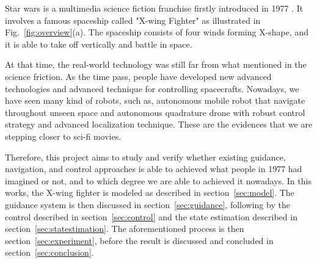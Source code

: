 Star wars is a multimedia science fiction franchise firstly introduced in 1977 \cite{starwars}. It involves a famous spaceship called "X-wing Fighter" as illustrated in Fig.~\ref{fig:overview}(a). The spaceship consists of four winds forming X-shape, and it is able to take off vertically and battle in space. 

At that time, the real-world technology was still far from what mentioned in the science friction. As the time pass, people have developed new advanced technologies and advanced technique for controlling spacecrafts. Nowadays, we have seen many kind of robots, such as, autonomous mobile robot \cite{mir} that navigate throughout unseen space and autonomous quadrature drone \cite{mpc_drone,scimet_paper} with robust control strategy and advanced localization technique. These are the evidences that we are stepping closer to sci-fi movies. 

Therefore, this project aims to study and verify whether existing guidance, navigation, and control approaches is able to achieved what people in 1977 had imagined or not, and to which degree we are able to achieved it nowadays. In this works, the X-wing fighter is modeled as described in section~\ref{sec:model}. The guidance system is then discussed in section~\ref{sec:guidance}, following by the control described in  section~\ref{sec:control} and the state estimation described in  section~\ref{sec:statestimation}. The aforementioned process is then section~\ref{sec:experiment}, before the result is discussed and concluded in section~\ref{sec:conclusion}.